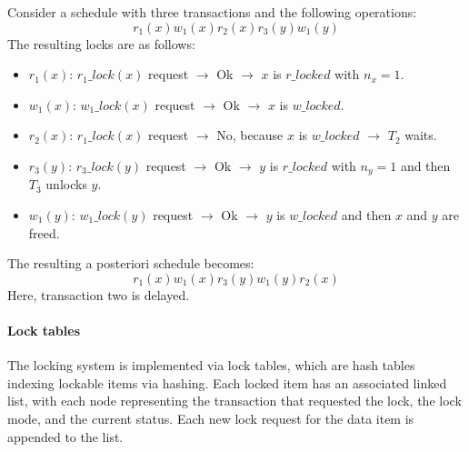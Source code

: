 \begin{example}
    Consider a schedule with three transactions and the following operations:
    \[r_1(x)w_1(x)r_2(x)r_3(y)w_1(y)\]
    The resulting locks are as follows:
    \begin{itemize}
        \item $r_1(x)$: $r_1\_lock(x)$ request $\rightarrow$ Ok $\rightarrow$ $x$ is $r\_locked$ with $n_x=1$. 
        \item $w_1(x)$: $w_1\_lock(x)$ request $\rightarrow$ Ok $\rightarrow$ $x$ is $w\_locked$. 
        \item $r_2(x)$: $r_1\_lock(x)$ request $\rightarrow$ No, because $x$ is $w\_locked$ $\rightarrow$ $T_2$ waits. 
        \item $r_3(y)$: $r_3\_lock(y)$ request $\rightarrow$ Ok $\rightarrow$ $y$ is $r\_locked$ with $n_y=1$ and then $T_3$ unlocks $y$. 
        \item $w_1(y)$: $w_1\_lock(y)$ request $\rightarrow$ Ok $\rightarrow$ $y$ is $w\_locked$ and then $x$ and $y$ are freed. 
    \end{itemize}
    The resulting a posteriori schedule becomes:
    \[r_1(x)w_1(x)r_3(y)w_1(y)r_2(x)\]
    Here, transaction two is delayed. 
\end{example}

\paragraph*{Lock tables}
The locking system is implemented via lock tables, which are hash tables indexing lockable items via hashing. 
Each locked item has an associated linked list, with each node representing the transaction that requested the lock, the lock mode, and the current status. 
Each new lock request for the data item is appended to the list.

